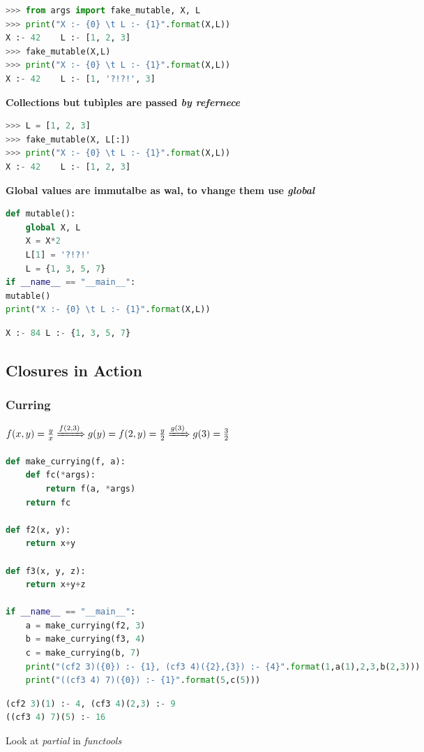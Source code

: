 \begin{lstlisting}[language=Python]
>>> from args import fake_mutable, X, L
>>> print("X :- {0} \t L :- {1}".format(X,L))
X :- 42    L :- [1, 2, 3]
>>> fake_mutable(X,L)
>>> print("X :- {0} \t L :- {1}".format(X,L))
X :- 42    L :- [1, '?!?!', 3]
\end{lstlisting}

\textbf{Collections but tubìples are passed \textit{by refernece}}

\begin{lstlisting}[language=Python]
>>> L = [1, 2, 3]
>>> fake_mutable(X, L[:])
>>> print("X :- {0} \t L :- {1}".format(X,L))
X :- 42    L :- [1, 2, 3]
\end{lstlisting}

\textbf{Global values are immutalbe as wal, to vhange them use \textit{global}}

\begin{lstlisting}[language=Python]
def mutable():
	global X, L
	X = X*2
	L[1] = '?!?!'
	L = {1, 3, 5, 7}
if __name__ == "__main__":
mutable()
print("X :- {0} \t L :- {1}".format(X,L))
\end{lstlisting}

\begin{lstlisting}[language=Python]
X :- 84 L :- {1, 3, 5, 7}
\end{lstlisting}

\subsection{Closures in Action}

\subsubsection{Curring}

\(f(x, y) = \frac{y}{x} \xRightarrow{f(2, 3)} g(y) = f(2, y) = \frac{y}{2} \xRightarrow{g(3)} g(3) = \frac{3}{2}\)

\begin{lstlisting}[language=Python]
def make_currying(f, a):
	def fc(*args):
		return f(a, *args)
	return fc
	
def f2(x, y):
	return x+y
	
def f3(x, y, z):
	return x+y+z

if __name__ == "__main__":
	a = make_currying(f2, 3)
	b = make_currying(f3, 4)
	c = make_currying(b, 7)
	print("(cf2 3)({0}) :- {1}, (cf3 4)({2},{3}) :- {4}".format(1,a(1),2,3,b(2,3)))
	print("((cf3 4) 7)({0}) :- {1}".format(5,c(5)))
\end{lstlisting}


\begin{lstlisting}[language=Python]
(cf2 3)(1) :- 4, (cf3 4)(2,3) :- 9
((cf3 4) 7)(5) :- 16
\end{lstlisting}

Look at \textit{partial} in \textit{functools}
